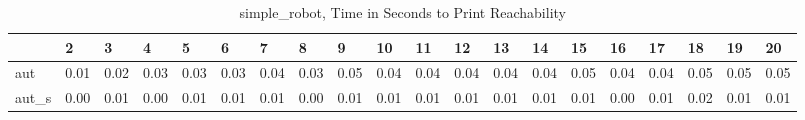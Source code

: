 \begin{table}
\centering
\caption{simple_robot, Time in Seconds to Print Reachability}
\label{simple_robot_states_time}
\begin{tabular}{llllllllllllllllllll}
\toprule
{} &     2 &     3 &     4 &     5 &     6 &     7 &     8 &     9 &    10 &    11 &    12 &    13 &    14 &    15 &    16 &    17 &    18 &    19 &    20 \\
\midrule
aut   &  0.01 &  0.02 &  0.03 &  0.03 &  0.03 &  0.04 &  0.03 &  0.05 &  0.04 &  0.04 &  0.04 &  0.04 &  0.04 &  0.05 &  0.04 &  0.04 &  0.05 &  0.05 &  0.05 \\
aut\_s &  0.00 &  0.01 &  0.00 &  0.01 &  0.01 &  0.01 &  0.00 &  0.01 &  0.01 &  0.01 &  0.01 &  0.01 &  0.01 &  0.01 &  0.00 &  0.01 &  0.02 &  0.01 &  0.01 \\
\bottomrule
\end{tabular}
\end{table}
